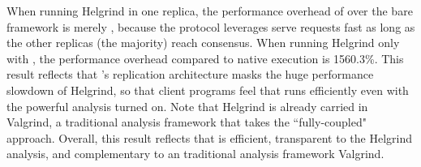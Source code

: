 When running Helgrind in one replica, the performance overhead of \xxx over the 
bare framework is merely \overhead, because the \paxos protocol \xxx leverages 
serve requests fast as long as the other replicas (the majority) reach 
consensus. When running Helgrind only with \mediatomb, the performance overhead 
compared to native execution is 1560.3\%. This result reflects that \xxx's 
replication architecture masks the huge performance slowdown of Helgrind, so 
that client programs feel that \mediatomb runs efficiently even with the 
powerful analysis turned on. Note that Helgrind is already carried in Valgrind, 
a traditional analysis framework that takes the ``fully-coupled" approach. 
Overall, this result reflects that \xxx is efficient, transparent to the 
Helgrind analysis, and complementary to an traditional analysis framework 
Valgrind.
